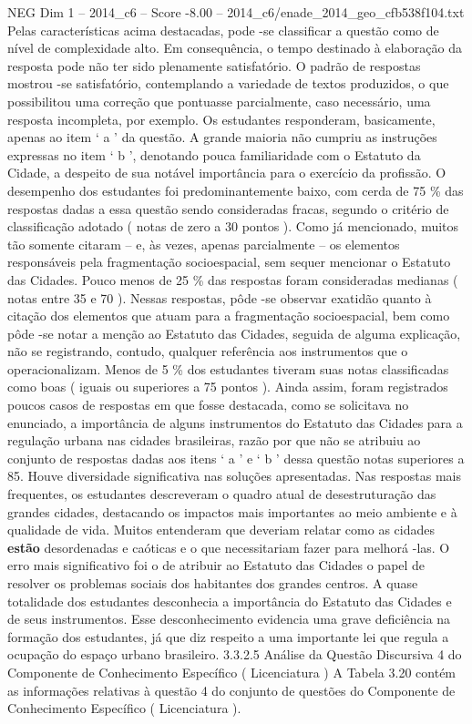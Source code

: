 \begin{textsample}{NEG Dim 1 – 2014\_c6 – Score -8.00 – 2014\_c6/enade\_2014\_geo\_cfb538f104.txt}
Pelas características acima destacadas, pode -se classificar a questão como de nível de complexidade alto.
Em consequência, o tempo destinado à elaboração da resposta pode não ter sido plenamente satisfatório.
O padrão de respostas mostrou -se satisfatório, contemplando a variedade de textos produzidos, o que possibilitou uma correção que pontuasse parcialmente, caso necessário, uma resposta incompleta, por exemplo.
Os estudantes responderam, basicamente, apenas ao item ‘ a ’ da questão.
A grande maioria não cumpriu as instruções expressas no item ‘ b ’, denotando pouca familiaridade com o Estatuto da Cidade, a despeito de sua notável importância para o exercício da profissão.
O desempenho dos estudantes foi predominantemente baixo, com cerda de 75 \% das respostas dadas a essa questão sendo consideradas fracas, segundo o critério de classificação adotado ( notas de zero a 30 pontos ).
Como já mencionado, muitos tão somente citaram – e, às vezes, apenas parcialmente – os elementos responsáveis pela fragmentação socioespacial, sem sequer mencionar o Estatuto das Cidades.
Pouco menos de 25 \% das respostas foram consideradas medianas ( notas entre 35 e 70 ).
Nessas respostas, pôde -se observar exatidão quanto à citação dos elementos que atuam para a fragmentação socioespacial, bem como pôde -se notar a menção ao Estatuto das Cidades, seguida de alguma explicação, não se registrando, contudo, qualquer referência aos instrumentos que o operacionalizam.
Menos de 5 \% dos estudantes tiveram suas notas classificadas como boas ( iguais ou superiores a 75 pontos ).
Ainda assim, foram registrados poucos casos de respostas em que fosse destacada, como se solicitava no enunciado, a importância de alguns instrumentos do Estatuto das Cidades para a regulação urbana nas cidades brasileiras, razão por que não se atribuiu ao conjunto de respostas dadas aos itens ‘ a ’ e ‘ b ’ dessa questão notas superiores a 85.
Houve diversidade significativa nas soluções apresentadas.
Nas respostas mais frequentes, os estudantes descreveram o quadro atual de desestruturação das grandes cidades, destacando os impactos mais importantes ao meio ambiente e à qualidade de vida.
Muitos entenderam que deveriam relatar como as cidades \textbf{estão} desordenadas e caóticas e o que necessitariam fazer para melhorá -las.
O erro mais significativo foi o de atribuir ao Estatuto das Cidades o papel de resolver os problemas sociais dos habitantes dos grandes centros.
A quase totalidade dos estudantes desconhecia a importância do Estatuto das Cidades e de seus instrumentos.
Esse desconhecimento evidencia uma grave deficiência na formação dos estudantes, já que diz respeito a uma importante lei que regula a ocupação do espaço urbano brasileiro. 3.3.2.5 Análise da Questão Discursiva 4 do Componente de Conhecimento Específico ( Licenciatura ) A Tabela 3.20 contém as informações relativas à questão 4 do conjunto de questões do Componente de Conhecimento Específico ( Licenciatura ).

\end{textsample}
